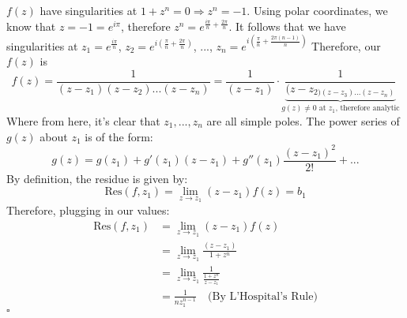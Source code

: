 \documentclass[11pt]{article}
\newenvironment{proof}{\noindent{\bf Proof.}}{\hfill $\square$\medskip}
\begin{document}
\begin{proof}
$f(z)$ have singularities at $1+z^{n}=0\Rightarrow z^{n}=-1$. Using polar coordinates, we know that $z=-1=e^{i\pi}$, therefore $z^{n}=e^{\frac{i\pi}{n}+\frac{2\pi}{n}}$. It follows that we have singularities at $z_{1}=e^{\frac{i\pi}{n}}$, $z_{2}=e^{i(\frac{\pi}{n}+\frac{2\pi}{n})}$, ..., $z_{n}=e^{i(\frac{\pi}{n}+\frac{2\pi(n-1)}{n})}$
Therefore, our $f(z)$ is
$$f(z)=\frac{1}{(z-z_{1})(z-z_{2})...(z-z_{n})}=\frac{1}{(z-z_{1})}\cdot\underbrace{\frac{1}{(z-z_{2)(z-z_{3})...(z-z_{n})}}}_\text{$g(z)\neq0$ at $z_{1}$, therefore analytic}$$
Where from here, it's clear that $z_{1},...,z_{n}$ are all simple poles. The power series of $g(z)$ about $z_{1}$ is of the form:
$$g(z)=g(z_{1})+g'(z_{1})(z-z_{1})+g''(z_{1})\frac{(z-z_{1})^{2}}{2!}+...$$
By definition, the residue is given by:
$$\text{Res}(f,z_{1})=\lim_{z\to z_{1}}(z-z_{1})f(z)=b_{1}$$
Therefore, plugging in our values:
\begin{equation}
    \begin{split}
        \text{Res}(f,z_{1})&=\lim_{z\to z_{1}}(z-z_{1})f(z)\\
        &=\lim_{z\to z_{1}}\frac{(z-z_{1})}{1+z^{n}}\\
        &=\lim_{z\to z_{1}}\frac{1}{\frac{1+z^{n}}{z-z_{1}}}\\
        &=\frac{1}{nz_{1}^{n-1}}\quad\text{(By L'Hospital's Rule)}
    \end{split}
\end{equation}
\end{proof}


\newpage
\end{document}
